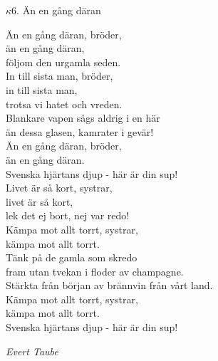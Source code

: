 \documentclass[a6paper,10pt]{article}
\begin{document}
\setlength{\oddsidemargin}{-0.37in}
\noindent
\begin{center}
\Large $\kappa6$. Än en gång däran \\ 
\end{center}
Än en gång däran, bröder,\\
än en gång däran,\\
följom den urgamla seden.\\
In till sista man, bröder,\\
in till sista man,\\
trotsa vi hatet och vreden. \\
Blankare vapen sågs aldrig i en här\\
än dessa glasen, kamrater i gevär!\\
Än en gång däran, bröder,\\
än en gång däran.\\
Svenska hjärtans djup - här är din sup!
\vspace{5pt}\\
Livet är så kort, systrar,\\
livet är så kort,\\
lek det ej bort, nej var redo!\\
Kämpa mot allt torrt, systrar,\\
kämpa mot allt torrt.\\
Tänk på de gamla som skredo\\
fram utan tvekan i floder av champagne.\\
Stärkta från början av brännvin från vårt land.\\
Kämpa mot allt torrt, systrar,\\
kämpa mot allt torrt.\\
Svenska hjärtans djup - här är din sup! 
\begin{flushright}
\textit{Evert Taube}
\end{flushright}
\end{document}
